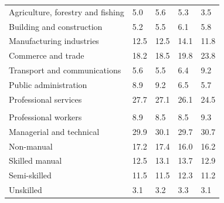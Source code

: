 \documentclass{article}
\begin{document}
\begin{table}[h]
\begin{tabular}{KTTTT}
    \hline
Agriculture, forestry and fishing  & 5.0& 5.6& 5.3& 3.5\\
Building and construction & 5.2& 5.5& 6.1& 5.8\\
Manufacturing industries & 12.5& 12.5& 14.1& 11.8\\
Commerce and trade  & 18.2& 18.5& 19.8& 23.8\\
Transport and communications  & 5.6& 5.5& 6.4& 9.2\\
Public administration & 8.9& 9.2& 6.5& 5.7\\
Professional services & 27.7& 27.1& 26.1& 24.5\\
\hline
    \\ 
    \hline
Professional workers  & 8.9& 8.5 & 8.5& 9.3\\
Managerial and technical & 29.9& 30.1& 29.7& 30.7\\
Non-manual & 17.2& 17.4& 16.0& 16.2\\
Skilled manual & 12.5& 13.1& 13.7& 12.9\\
Semi-skilled & 11.5& 11.5& 12.3& 11.2\\
Unskilled  & 3.1& 3.2& 3.3& 3.1\\
\end{tabular}
\end{table}
\pagebreak
\end{document}
